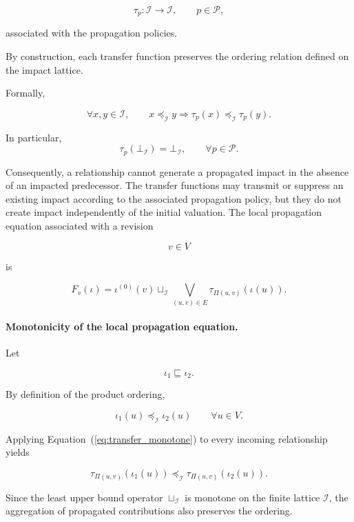 \documentclass[10pt]{article}
\begin{document}
	\[
	\tau_p :
	\mathcal I
	\rightarrow
	\mathcal I,
	\qquad
	p\in\mathcal P,
	\]
	
	associated with the propagation policies.
	
	By construction, each transfer function preserves the ordering relation defined
	on the impact lattice.
	
	Formally,
	
	\begin{equation}
		\label{eq:transfer_monotone}
		\forall
		x,y
		\in
		\mathcal I,
		\qquad
		x
		\preceq_{\mathcal I}
		y
		\Longrightarrow
		\tau_p(x)
		\preceq_{\mathcal I}
		\tau_p(y).
	\end{equation}
	
	In particular,
	\begin{equation}
		\tau_p
		\left(
		\bot_{\mathcal I}
		\right)
		=
		\bot_{\mathcal I},
		\qquad
		\forall p\in\mathcal P.
		\label{eq:transfer_bottom_preservation}
	\end{equation}
	
	Consequently, a relationship cannot generate a propagated impact in the absence
	of an impacted predecessor. The transfer functions may transmit or suppress an
	existing impact according to the associated propagation policy, but they do not
	create impact independently of the initial valuation.
	The local propagation equation associated with a revision
	
	\[
	v\in V
	\]
	
	is
	
	\[
	F_v(\iota)
	=
	\iota^{(0)}(v)
	\sqcup_{\mathcal I}
	\bigvee_{(u,v)\in E}
	\tau_{\Pi(u,v)}
	(
	\iota(u)
	).
	\]
	
	\paragraph{Monotonicity of the local propagation equation.}
	
	Let
	
	\[
	\iota_1
	\sqsubseteq
	\iota_2.
	\]
	
	By definition of the product ordering,
	
	\[
	\iota_1(u)
	\preceq_{\mathcal I}
	\iota_2(u)
	\qquad
	\forall u\in V.
	\]
	
	Applying Equation~(\ref{eq:transfer_monotone}) to every incoming relationship
	yields
	
	\[
	\tau_{\Pi(u,v)}
	(
	\iota_1(u)
	)
	\preceq_{\mathcal I}
	\tau_{\Pi(u,v)}
	(
	\iota_2(u)
	).
	\]
	
	Since the least upper bound operator
	$\sqcup_{\mathcal I}$
	is monotone on the finite lattice
	$\mathcal I$,
	the aggregation of propagated contributions also preserves the ordering.
	
\end{document}
